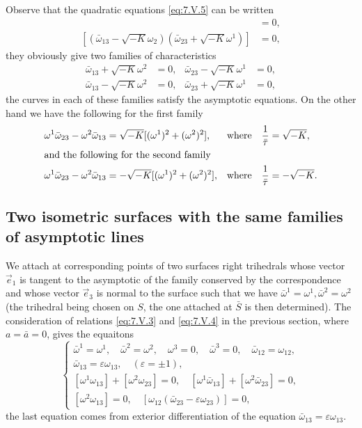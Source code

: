 \documentclass[leqno,11pt]{book}
\numberwithin{equation}{chapter}
\theoremstyle{shape1}
\theoremstyle{shape0}
\theoremstyle{shape2}
\theoremstyle{definition}
\begin{document}
Observe that the quadratic equations \eqref{eq:7.V.5} can be written
\begin{align*}
  [(\bar\omega_{13}+\sqrt{-K}\omega_{2})(\bar\omega_{23}-\sqrt{-K}\omega^{1})]&=0,\\
  [(\bar\omega_{13}-\sqrt{-K}\omega_{2})(\bar\omega_{23}+\sqrt{-K}\omega^{1})]&=0,
\end{align*}
they obviously give two families of characteristics
\begin{align*}
  \bar\omega_{13}+\sqrt{-K}\omega^{2}&=0,&\bar\omega_{23}-\sqrt{-K}\omega^{1}&=0,\\
  \bar\omega_{13}-\sqrt{-K}\omega^{2}&=0,&\bar\omega_{23}+\sqrt{-K}\omega^{1}&=0,
\end{align*}
the curves in each of these families satisfy the asymptotic equations. On the other hand we have the following for the first family\label{s21}
\begin{align*}
\omega^{1}\bar\omega_{23}-\omega^{2}\bar\omega_{13}&=\sqrt{-K}[(\omega^{1})^{2}+(\omega^{2})^{2}],&\text{where}&&\frac{1}{\bar\tau}&=\sqrt{-K},\\
\intertext{and the following for the second family}
\omega^{1}\bar\omega_{23}-\omega^{2}\bar\omega_{13}&=-\sqrt{-K}[(\omega^{1})^{2}+(\omega^{2})^{2}],&\text{where}&&\frac{1}{\bar\tau}&=-\sqrt{-K}.
\end{align*}



\subsection{Two isometric surfaces with the same families of asymptotic lines}
\label{sec:some-isoth-surf-1}

\fsec We attach  at corresponding points of two surfaces right trihedrals whose vector $\vec e_{1}$ is tangent to the asymptotic of the family conserved by the correspondence and whose vector $\vec e_{3}$ is normal to the surface such that we have $\bar\omega^{1}=\omega^{1}, \bar\omega^{2}=\omega^{2}$ (the trihedral being chosen on $S$, the one attached at $\bar S$ is then determined). The consideration of relations \eqref{eq:7.V.3} and \eqref{eq:7.V.4} in the previous section, where $a=\bar a=0$, gives the equaitons
\begin{equation}
  \label{eq:7.VI.1}\tag{VI, 1}
  \left\{
    \begin{gathered}
      \bar\omega^{1}=\omega^{1},\quad\bar\omega^{2}=\omega^{2},\quad\omega^{3}=0,\quad\bar\omega^{3}=0,\quad\bar\omega_{12}=\omega_{12},\\
      \bar\omega_{13}=\varepsilon\omega_{13},\quad(\varepsilon=\pm1),\\
      [\omega^{1}\omega_{13}]+[\omega^{2}\omega_{23}]=0,\quad[\omega^{1}\bar\omega_{13}]+[\omega^{2}\bar\omega_{23}]=0,\\
      [\omega^{2}\omega_{13}]=0,\quad[\omega_{12}(\bar\omega_{23}-\varepsilon\omega_{23})]=0,
    \end{gathered}
  \right.
\end{equation}
the last equation comes from exterior differentiation of the equation $\bar\omega_{13}=\varepsilon\omega_{13}$.
\end{document}
